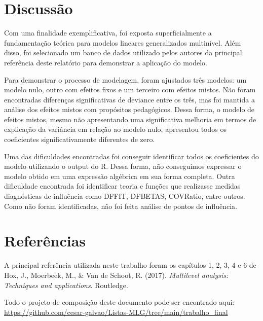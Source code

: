\documentclass[
  letterpaper,
  DIV=11,
  numbers=noendperiod]{scrartcl}
\begin{document}
\newpage{}

\hypertarget{discussuxe3o}{%
\section{Discussão}\label{discussuxe3o}}

Com uma finalidade exemplificativa, foi exposta superficialmente a
fundamentação teórica para modelos lineares generalizados multinível.
Além disso, foi selecionado um banco de dados utilizado pelos autores da
principal referência deste relatório para demonstrar a aplicação do
modelo.

Para demonstrar o processo de modelagem, foram ajustados três modelos:
um modelo nulo, outro com efeitos fixos e um terceiro com efeitos
mistos. Não foram encontradas diferenças significativas de deviance
entre os três, mas foi mantida a análise dos efeitos mistos com
propósitos pedagógicos. Dessa forma, o modelo de efeitos mistos, mesmo
não apresentando uma significativa melhoria em termos de explicação da
variância em relação ao modelo nulo, apresentou todos os coeficientes
significativamente diferentes de zero.

Uma das dificuldades encontradas foi conseguir identificar todos os
coeficientes do modelo utilizando o output do R. Dessa forma, não
conseguimos expressar o modelo obtido em uma expressão algébrica em sua
forma completa. Outra dificuldade encontrada foi identificar teoria e
funções que realizasse medidas diagnósticas de influência como DFFIT,
DFBETAS, COVRatio, entre outros. Como não foram identificadas, não foi
feita análise de pontos de influência.

\newpage{}

\hypertarget{referuxeancias}{%
\section{Referências}\label{referuxeancias}}

A principal referência utilizada neste trabalho foram os capítulos 1, 2,
3, 4 e 6 de Hox, J., Moerbeek, M., \& Van de Schoot, R. (2017).
\emph{Multilevel analysis: Techniques and applications}. Routledge.

Todo o projeto de composição deste documento pode ser encontrado aqui:
\url{https://github.com/cesar-galvao/Listas-MLG/tree/main/trabalho_final}
\end{document}
